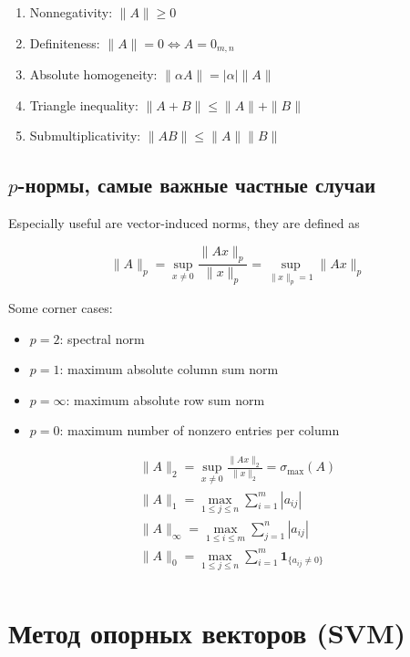 \documentclass[a4paper, 14pt]{article}
\begin{document}
    \begin{enumerate}
        \item Nonnegativity: \( \|A\| \geq 0 \)
        \item Definiteness: \( \|A\| = 0 \iff A = 0_{m,n} \)
        \item Absolute homogeneity: \( \|\alpha A\| = |\alpha| \|A\| \)
        \item Triangle inequality: \( \|A + B\| \leq \|A\| + \|B\| \)
        \item Submultiplicativity: \( \|AB\| \leq \|A\| \|B\| \)
    \end{enumerate}
    
    \subsection{$p$-нормы, самые важные частные случаи}
    
    Especially useful are vector-induced norms, they are defined as
    
    \[ \|A\|_p = \sup_{x \neq 0} \frac{\|Ax\|_p}{\|x\|_p} = \sup_{\|x\|_p = 1} \|Ax\|_p \]
    
    Some corner cases:
    
    \begin{itemize}
        \item \( p = 2 \): spectral norm
        \item \( p = 1 \): maximum absolute column sum norm
        \item \( p = \infty \): maximum absolute row sum norm
        \item \( p = 0 \): maximum number of nonzero entries per column
    \end{itemize}
    
    \begin{gather*}
        \|A\|_2 = \sup_{x \neq 0} \frac{\|Ax\|_2}{\|x\|_2} = \sigma_{\max}(A)\\
        \|A\|_1 = \max_{1 \leq j \leq n} \sum_{i=1}^m |a_{ij}|\\
        \|A\|_\infty = \max_{1 \leq i \leq m} \sum_{j=1}^n |a_{ij}|\\
        \|A\|_0 = \max_{1 \leq j \leq n} \sum_{i=1}^m \mathbf{1}_{\{a_{ij} \neq 0\}}\\
    \end{gather*}
    
    \section{Метод опорных векторов (SVM)}
    
    
\end{document}
